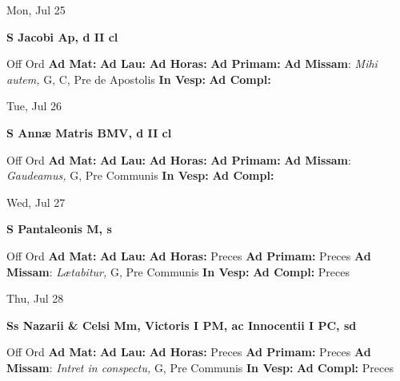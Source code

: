 \documentclass[10pt]{article}
\begin{document}
\begin{minipage}{3.5in}
\vspace{2em}\begin{center}
Mon, Jul 25
\end{center}\textbf{ \large S Jacobi Ap, \textnormal{\normalsize d II cl}}
\begin{justify}
Off Ord
\textbf{Ad Mat: }
\textbf{Ad Lau: }
\textbf{Ad Horas: }
\textbf{Ad Primam: }
\textbf{Ad Missam}: \textit{Mihi autem,} G, C, Pre de Apostolis
\textbf{In Vesp: }
\textbf{Ad Compl: }\end{justify}
\end{minipage}



\begin{minipage}{3.5in}
\vspace{2em}\begin{center}
Tue, Jul 26
\end{center}\textbf{ \large S Annæ Matris BMV, \textnormal{\normalsize d II cl}}
\begin{justify}
Off Ord
\textbf{Ad Mat: }
\textbf{Ad Lau: }
\textbf{Ad Horas: }
\textbf{Ad Primam: }
\textbf{Ad Missam}: \textit{Gaudeamus,} G, Pre Communis
\textbf{In Vesp: }
\textbf{Ad Compl: }\end{justify}
\end{minipage}



\begin{minipage}{3.5in}
\vspace{2em}\begin{center}
Wed, Jul 27
\end{center}\textbf{ \large S Pantaleonis M, \textnormal{\normalsize s}}
\begin{justify}
Off Ord
\textbf{Ad Mat: }
\textbf{Ad Lau: }
\textbf{Ad Horas: }Preces
\textbf{Ad Primam: }Preces
\textbf{Ad Missam}: \textit{Lætabitur,} G, Pre Communis
\textbf{In Vesp: }
\textbf{Ad Compl: }Preces\end{justify}
\end{minipage}



\begin{minipage}{3.5in}
\vspace{2em}\begin{center}
Thu, Jul 28
\end{center}\textbf{ \large Ss Nazarii \& Celsi Mm, Victoris I PM, ac Innocentii I PC, \textnormal{\normalsize sd}}
\begin{justify}
Off Ord
\textbf{Ad Mat: }
\textbf{Ad Lau: }
\textbf{Ad Horas: }Preces
\textbf{Ad Primam: }Preces
\textbf{Ad Missam}: \textit{Intret in conspectu,} G, Pre Communis
\textbf{In Vesp: }
\textbf{Ad Compl: }Preces\end{justify}
\end{minipage}
\end{document}
